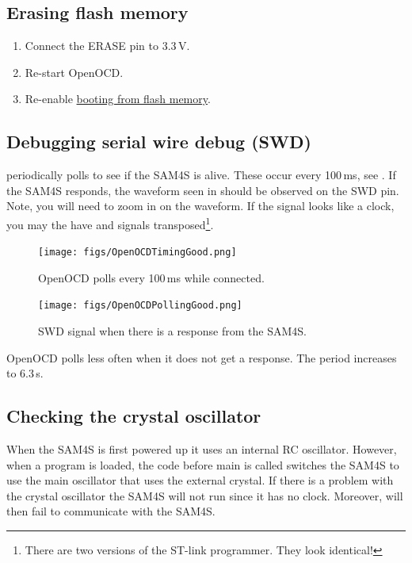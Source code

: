 \subsection{Erasing flash memory}
\label{erasing-flash-memory}

\begin{enumerate}
\item Connect the ERASE pin to 3.3\,V.

\item Re-start OpenOCD.

\item Re-enable \hyperref[booting-from-flash-memory]{booting from
  flash memory}.
\end{enumerate}


\subsection{Debugging serial wire debug (SWD)}
\label{debugging-serial-wire-debug-swd}

 periodically polls to see if the SAM4S is alive.
These occur every 100\,ms, see .  If the SAM4S
responds, the waveform seen in  should be
observed on the SWD pin.  Note, you will need to zoom in on the
waveform.  If the signal looks like a clock, you may the have
 and  signals transposed\footnote{There are two
  versions of the ST-link programmer.  They look identical!}.


\begin{figure}[!h]
\centering
\texttt{[image: figs/OpenOCDTimingGood.png]}
\caption{OpenOCD polls every 100\,ms while connected.}
\label{fig:openocd-poll}
\end{figure}

\begin{figure}[!h]
\centering
\texttt{[image: figs/OpenOCDPollingGood.png]}
\caption{SWD signal when there is a response from the SAM4S.}
\label{fig:openocd-response}
\end{figure}


OpenOCD polls less often when it does not get a response. The period
increases to 6.3\,s.

\subsection{Checking the crystal oscillator}
\label{checking-the-crystal-oscillator}

When the SAM4S is first powered up it uses an internal RC oscillator.
However, when a program is loaded, the code before main is called
switches the SAM4S to use the main oscillator that uses the external
crystal.  If there is a problem with the crystal oscillator the SAM4S
will not run since it has no clock.  Moreover,  will
then fail to communicate with the SAM4S.

